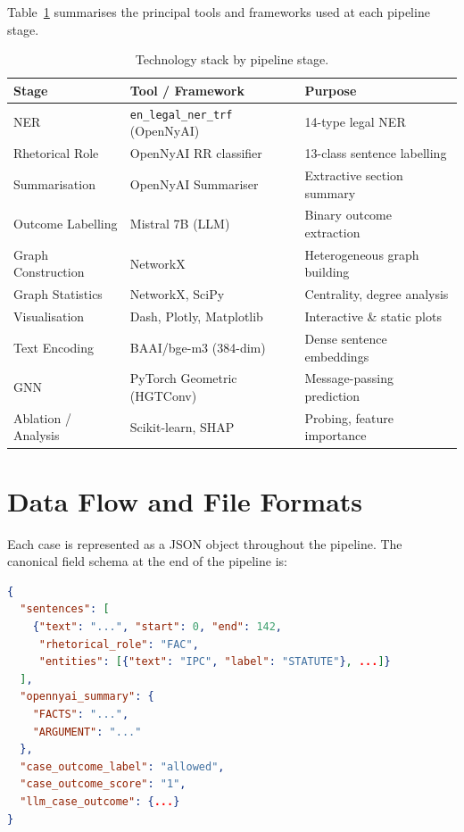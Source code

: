 \documentclass[12pt,a4paper]{report}
\begin{document}
Table~\ref{tab:tech_stack} summarises the principal tools and frameworks used at each pipeline stage.

\begin{table}[H]
  \centering
  \caption{Technology stack by pipeline stage.}
  \label{tab:tech_stack}
  \begin{tabular}{lll}
    \toprule
    \textbf{Stage} & \textbf{Tool / Framework} & \textbf{Purpose} \\
    \midrule
    NER & \texttt{en\_legal\_ner\_trf} (OpenNyAI) & 14-type legal NER \\
    Rhetorical Role & OpenNyAI RR classifier & 13-class sentence labelling \\
    Summarisation & OpenNyAI Summariser & Extractive section summary \\
    Outcome Labelling & Mistral 7B (LLM) & Binary outcome extraction \\
    Graph Construction & NetworkX & Heterogeneous graph building \\
    Graph Statistics & NetworkX, SciPy & Centrality, degree analysis \\
    Visualisation & Dash, Plotly, Matplotlib & Interactive \& static plots \\
    Text Encoding & BAAI/bge-m3 (384-dim) & Dense sentence embeddings \\
    GNN & PyTorch Geometric (HGTConv) & Message-passing prediction \\
    Ablation / Analysis & Scikit-learn, SHAP & Probing, feature importance \\
    \bottomrule
  \end{tabular}
\end{table}

\section{Data Flow and File Formats}
\label{sec:data_flow}

Each case is represented as a JSON object throughout the pipeline. The canonical field schema at the end of the pipeline is:

\begin{lstlisting}[language=json,caption={Canonical per-case JSON schema (simplified).},label=lst:json_schema]
{
  "sentences": [
    {"text": "...", "start": 0, "end": 142,
     "rhetorical_role": "FAC",
     "entities": [{"text": "IPC", "label": "STATUTE"}, ...]}
  ],
  "opennyai_summary": {
    "FACTS": "...",
    "ARGUMENT": "..."
  },
  "case_outcome_label": "allowed",
  "case_outcome_score": "1",
  "llm_case_outcome": {...}
}
\end{lstlisting}
\end{document}
